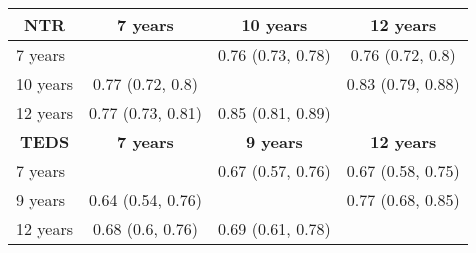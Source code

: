 \begin{tabular}{lccr}
  \toprule
  \multicolumn{1}{c}{\textbf{NTR}} & \textbf{7 years} & \textbf{10 years} & \multicolumn{1}{c}{\textbf{12 years}} \\
  \midrule
  7 years &       & 0.76 (0.73, 0.78) & \multicolumn{1}{c}{0.76 (0.72, 0.8)} \\
  10 years & 0.77 (0.72, 0.8) &       & \multicolumn{1}{c}{0.83 (0.79, 0.88)} \\
  12 years & 0.77 (0.73, 0.81) & 0.85 (0.81, 0.89) &  \\
  \midrule
  \multicolumn{1}{c}{\textbf{TEDS}} & \textbf{7 years} & \textbf{9 years} & \multicolumn{1}{c}{\textbf{12 years}} \\
  \midrule
  7  years &       & 0.67 (0.57, 0.76) & \multicolumn{1}{c}{0.67 (0.58, 0.75)} \\
  9  years & 0.64 (0.54, 0.76) &       & \multicolumn{1}{c}{0.77 (0.68, 0.85)} \\
  12 years & 0.68 (0.6, 0.76) & 0.69 (0.61, 0.78) &  \\
  \bottomrule
\end{tabular}%
